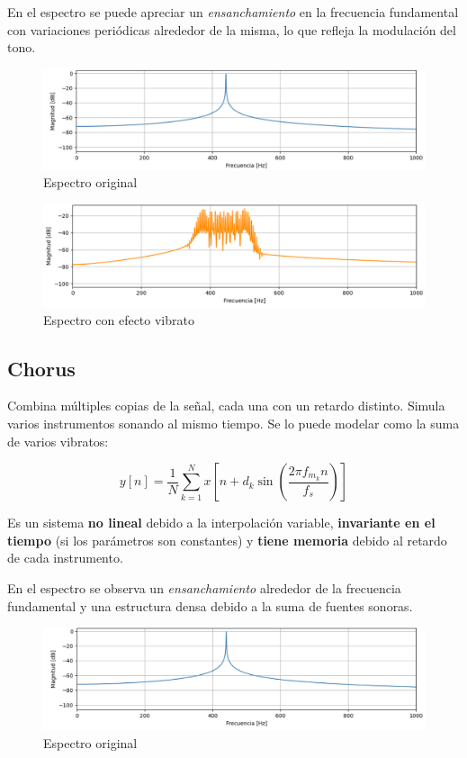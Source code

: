 \documentclass[12pt]{article}
\begin{document}
En el espectro se puede apreciar un \textit{ensanchamiento} en la frecuencia fundamental con variaciones periódicas alrededor de la misma, lo que refleja la modulación del tono.

\begin{figure}[H]
    \centering
    \includegraphics[width=0.75\linewidth]{plot/vibrato_original.png}
    \caption{Espectro original}
    \label{vibrato_original}
\end{figure}

\begin{figure}[H]
    \centering
    \includegraphics[width=0.75\linewidth]{plot/vibrato_efecto.png}
    \caption{Espectro con efecto vibrato}
    \label{vibrato_efecto}
\end{figure}

\subsection*{Chorus}

Combina múltiples copias de la señal, cada una con un retardo distinto.  
Simula varios instrumentos sonando al mismo tiempo.  
Se lo puede modelar como la suma de varios vibratos:

\[
y[n] = \frac{1}{N} \sum_{k=1}^{N} x\!\left[n + d_k \sin\!\left( \frac{2\pi f_{m_k} n}{f_s} \right)\right]
\]

Es un sistema \textbf{no lineal} debido a la interpolación variable,  
\textbf{invariante en el tiempo} (si los parámetros son constantes) y \textbf{tiene memoria} debido al retardo de cada instrumento.  

En el espectro se observa un \textit{ensanchamiento} alrededor de la frecuencia fundamental  
y una estructura densa debido a la suma de fuentes sonoras.


\begin{figure}[H]
    \centering
    \includegraphics[width=0.75\linewidth]{plot/chorus_original.png}
    \caption{Espectro original}
    \label{chorus_original}
\end{figure}
\end{document}
